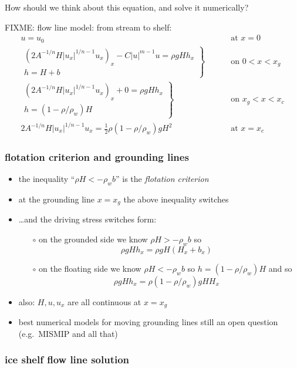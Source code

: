 \documentclass[titlepage,letterpaper,final,12pt]{scrartcl}
\newcommand{\alert}[1]{\emph{#1}}
\begin{document}
How should we think about this equation, and solve it numerically?

FIXME:  flow line model: from stream to shelf:
\begin{align*}
  u = u_0 & \qquad \text{ at } x = 0 \\
  \left.\begin{array}{r}
  \left(2 A^{-1/n} H |u_x|^{1/n - 1} u_x\right)_x - C|u|^{m-1}u = \rho g H h_x \\
  h = H + b
  \end{array}\right\}& \qquad \text{ on } 0 < x < x_g \\
  \left.\begin{array}{r}
  \left(2 A^{-1/n} H |u_x|^{1/n - 1} u_x\right)_x + 0 = \rho g H h_x \\
  h = (1-\rho/\rho_w) H
  \end{array}\right\}& \qquad \text{ on } x_g < x < x_c \\
  2 A^{-1/n} H |u_x|^{1/n - 1} u_x = \frac{1}{2}\rho (1-\rho/\rho_w) g H^2 & \qquad \text{ at } x = x_c
\end{align*}

\subsubsection*{flotation criterion and grounding lines}

\begin{itemize}
\item the inequality ``$\rho H < - \rho_w b$'' is the \alert{flotation criterion}
\item at the grounding line $x=x_g$ the above inequality switches
\item \dots and the driving stress switches form:
  \begin{itemize}
  \item[$\circ$] on the grounded side we know $\rho H > - \rho_w b$ so
  	$$\rho g H h_x = \rho g H (H_x + b_x)$$
  \item[$\circ$] on the floating side we know $\rho H < - \rho_w b$ so $h = (1-\rho/\rho_w) H$ and so
  	$$\rho g H h_x = \rho(1-\rho/\rho_w) g H H_x$$
  \end{itemize}
\item also: $H,u,u_x$ are all continuous at $x=x_g$
\item best numerical models for moving grounding lines still an open question (e.g.~MISMIP and all that)
\end{itemize}


\subsubsection*{ice shelf flow line solution}
\end{document}
